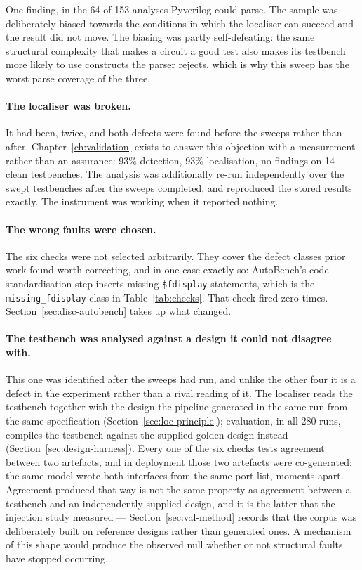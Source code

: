 \documentclass[11pt,a4paper,titlepage=false]{scrreprt}
\begin{document}
One finding, in the 64 of 153 analyses Pyverilog could parse. The sample was deliberately
biased towards the conditions in which the localiser can succeed and the result did not move.
The biasing was partly self-defeating: the same structural complexity that makes a circuit a
good test also makes its testbench more likely to use constructs the parser rejects, which is
why this sweep has the worst parse coverage of the three.

\paragraph{The localiser was broken.} It had been, twice, and both defects were found
before the sweeps rather than after. Chapter~\ref{ch:validation} exists to answer this
objection with a measurement rather than an assurance: 93\% detection, 93\% localisation,
no findings on 14 clean testbenches. The analysis was additionally re-run independently over
the swept testbenches after the sweeps completed, and reproduced the stored results exactly.
The instrument was working when it reported nothing.

\paragraph{The wrong faults were chosen.} The six checks were not selected arbitrarily. They
cover the defect classes prior work found worth correcting, and in one case exactly so:
AutoBench's code standardisation step inserts missing \texttt{\$fdisplay} statements, which
is the \texttt{missing\_fdisplay} class in Table~\ref{tab:checks}. That check fired zero
times. Section~\ref{sec:disc-autobench} takes up what changed.

\paragraph{The testbench was analysed against a design it could not disagree with.} This one
was identified after the sweeps had run, and unlike the other four it is a defect in the
experiment rather than a rival reading of it. The localiser reads the testbench together with
the design the pipeline generated in the same run from the same specification
(Section~\ref{sec:loc-principle}); evaluation, in all 280 runs, compiles the testbench
against the supplied golden design instead (Section~\ref{sec:design-harness}). Every one of
the six checks tests agreement between two artefacts, and in deployment those two artefacts
were co-generated: the same model wrote both interfaces from the same port list, moments
apart. Agreement produced that way is not the same property as agreement between a testbench
and an independently supplied design, and it is the latter that the injection study measured
--- Section~\ref{sec:val-method} records that the corpus was deliberately built on reference
designs rather than generated ones. A mechanism of this shape would produce the observed null
whether or not structural faults have stopped occurring.
\end{document}
